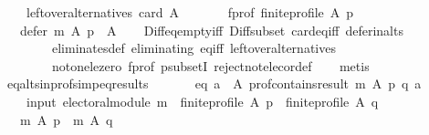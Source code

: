 \begin{isabellebody}
\ \ \ \ leftover{\isacharunderscore}{\kern0pt}alternatives{\isacharcolon}{\kern0pt}\ {\isachardoublequoteopen}card\ A\ {\isachargreater}{\kern0pt}\ {}{\isachardoublequoteclose}\ \isanewline
\ \ \ \ f{\isacharunderscore}{\kern0pt}prof{\isacharcolon}{\kern0pt}\ {\isachardoublequoteopen}finite{\isacharunderscore}{\kern0pt}profile\ A\ p{\isachardoublequoteclose}\isanewline
\ \ \ {\isachardoublequoteopen}defer\ m\ A\ p\ {\isasymsubset}\ A{\isachardoublequoteclose}\isanewline
%
\isadelimproof
\ \ %
\endisadelimproof
%
\isatagproof
{}\isamarkupfalse%
\ Diff{\isacharunderscore}{\kern0pt}eq{\isacharunderscore}{\kern0pt}empty{\isacharunderscore}{\kern0pt}iff\ Diff{\isacharunderscore}{\kern0pt}subset\ card{\isacharunderscore}{\kern0pt}eq{\isacharunderscore}{\kern0pt}{}{\isacharunderscore}{\kern0pt}iff\ defer{\isacharunderscore}{\kern0pt}in{\isacharunderscore}{\kern0pt}alts\isanewline
\ \ \ \ \ \ \ \ eliminates{\isacharunderscore}{\kern0pt}def\ eliminating\ eq{\isacharunderscore}{\kern0pt}iff\ leftover{\isacharunderscore}{\kern0pt}alternatives\isanewline
\ \ \ \ \ \ \ \ not{\isacharunderscore}{\kern0pt}one{\isacharunderscore}{\kern0pt}le{\isacharunderscore}{\kern0pt}zero\ f{\isacharunderscore}{\kern0pt}prof\ psubsetI\ reject{\isacharunderscore}{\kern0pt}not{\isacharunderscore}{\kern0pt}elec{\isacharunderscore}{\kern0pt}or{\isacharunderscore}{\kern0pt}def\isanewline
\ \ \isamarkupfalse%
\ metis%
\endisatagproof
{\isafoldproof}%
%
\isadelimproof
\isanewline
%
\endisadelimproof
\isanewline
{}\isamarkupfalse%
\ eq{\isacharunderscore}{\kern0pt}alts{\isacharunderscore}{\kern0pt}in{\isacharunderscore}{\kern0pt}profs{\isacharunderscore}{\kern0pt}imp{\isacharunderscore}{\kern0pt}eq{\isacharunderscore}{\kern0pt}results{\isacharcolon}{\kern0pt}\isanewline
\ \ \isanewline
\ \ \ \ eq{\isacharcolon}{\kern0pt}\ {\isachardoublequoteopen}{\isasymforall}a\ {\isasymin}\ A{\isachardot}{\kern0pt}\ prof{\isacharunderscore}{\kern0pt}contains{\isacharunderscore}{\kern0pt}result\ m\ A\ p\ q\ a{\isachardoublequoteclose}\ \isanewline
\ \ \ \ \isanewline
\ \ \ \ input{\isacharcolon}{\kern0pt}\ {\isachardoublequoteopen}electoral{\isacharunderscore}{\kern0pt}module\ m\ {\isasymand}\ finite{\isacharunderscore}{\kern0pt}profile\ A\ p\ {\isasymand}\ finite{\isacharunderscore}{\kern0pt}profile\ A\ q{\isachardoublequoteclose}\isanewline
\ \ \ {\isachardoublequoteopen}m\ A\ p\ {\isacharequal}{\kern0pt}\ m\ A\ q{\isachardoublequoteclose}\isanewline

\end{isabellebody}
